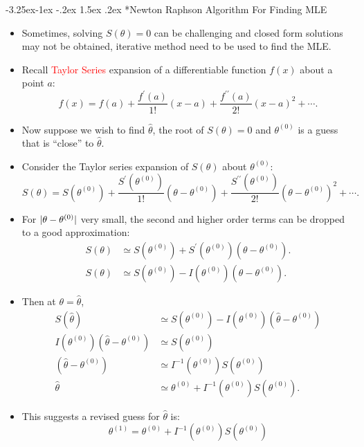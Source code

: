 \documentclass[final]{article}\usepackage[]{graphicx}\usepackage[svgnames]{xcolor}
\makeatletter
\renewcommand\subsection{\@startsection{subsection}{2}{\z@}%
                                     {-3.25ex\@plus -1ex \@minus -.2ex}%
                                     {1.5ex \@plus .2ex}%
                                     {\normalfont\large\bfseries\scshape\color{Blue}}}
\DeclarePairedDelimiter\abs{\lvert}{\rvert}
\makeatother
\begin{document}
\subsection*{Newton Raphson Algorithm For Finding MLE}
\begin{itemize}
      \item Sometimes, solving $ S(\theta)=0 $ can be challenging and closed form solutions may
            not be obtained, iterative method need to be used to find the MLE.
      \item Recall \textcolor{Red}{Taylor Series} expansion of a differentiable function $ f(x) $ about a point $ a $:
            \[ f(x)=f(a)+\frac{f^\prime(a)}{1!}(x-a)+\frac{f^{\prime\prime}(a)}{2!}(x-a)^2+\cdots.  \]
      \item Now suppose we wish to find $ \hat{\theta} $, the root of $ S(\theta)=0 $ and $ \theta^{(0)} $ is a guess that
            is ``close'' to $ \hat{\theta} $.
      \item Consider the Taylor series expansion of $ S(\theta) $ about $ \theta^{(0)} $:
            \[ S(\theta)=S(\theta^{(0)})+\frac{S^{\prime}(\theta^{(0)})}{1!}(\theta-\theta^{(0)})+\frac{S^{\prime\prime}(\theta^{(0)})}{2!}(\theta-\theta^{(0)})^2+\cdots.   \]
      \item For $ \abs{\theta-\theta^{(0)}} $ very small, the second and higher order terms can be dropped to a good approximation:
            \begin{align*}
                  S(\theta) & \simeq S(\theta^{(0)})+S^\prime(\theta^{(0)})(\theta-\theta^{(0)}). \\
                  S(\theta) & \simeq S(\theta^{(0)})-I(\theta^{(0)})(\theta-\theta^{(0)}).
            \end{align*}
      \item Then at $ \theta=\hat{\theta} $,
            \begin{align*}
                  S(\hat{\theta})                            & \simeq S(\theta^{(0)})-I(\theta^{(0)})(\hat{\theta}-\theta^{(0)}) \\
                  I(\theta^{(0)})(\hat{\theta}-\theta^{(0)}) & \simeq S(\theta^{(0)})                                            \\
                  (\hat{\theta}-\theta^{(0)})                & \simeq I^{-1}(\theta^{(0)})S(\theta^{(0)})                        \\
                  \hat{\theta}                               & \simeq \theta^{(0)}+I^{-1}(\theta^{(0)})S(\theta^{(0)}).
            \end{align*}
      \item This suggests a revised guess for $ \hat{\theta} $ is:
            \[ \theta^{(1)}=\theta^{(0)}+I^{-1}(\theta^{(0)})S(\theta^{(0)}) \]
\end{itemize}
\end{document}
